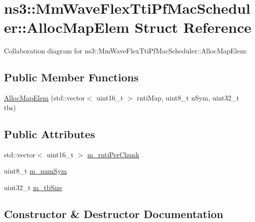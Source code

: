 \hypertarget{structns3_1_1MmWaveFlexTtiPfMacScheduler_1_1AllocMapElem}{}\section{ns3\+:\+:Mm\+Wave\+Flex\+Tti\+Pf\+Mac\+Scheduler\+:\+:Alloc\+Map\+Elem Struct Reference}
\label{structns3_1_1MmWaveFlexTtiPfMacScheduler_1_1AllocMapElem}


Collaboration diagram for ns3\+:\+:Mm\+Wave\+Flex\+Tti\+Pf\+Mac\+Scheduler\+:\+:Alloc\+Map\+Elem\+:
\subsection*{Public Member Functions}
\begin{DoxyCompactItemize}
\item 
\hyperlink{structns3_1_1MmWaveFlexTtiPfMacScheduler_1_1AllocMapElem_a311a654b51952538045d89c3a4c8c982}{Alloc\+Map\+Elem} (std\+::vector$<$ uint16\+\_\+t $>$ rnti\+Map, uint8\+\_\+t n\+Sym, uint32\+\_\+t tbs)
\end{DoxyCompactItemize}
\subsection*{Public Attributes}
\begin{DoxyCompactItemize}
\item 
std\+::vector$<$ uint16\+\_\+t $>$ \hyperlink{structns3_1_1MmWaveFlexTtiPfMacScheduler_1_1AllocMapElem_a4f7acb21c722350e588ffb3786dff855}{m\+\_\+rnti\+Per\+Chunk}
\item 
uint8\+\_\+t \hyperlink{structns3_1_1MmWaveFlexTtiPfMacScheduler_1_1AllocMapElem_a5c5cc7e33f85b68a50f52c334e025126}{m\+\_\+num\+Sym}
\item 
uint32\+\_\+t \hyperlink{structns3_1_1MmWaveFlexTtiPfMacScheduler_1_1AllocMapElem_a3c8cbfc4ab84e3eee2edf8a5b66f5e78}{m\+\_\+tb\+Size}
\end{DoxyCompactItemize}


\subsection{Constructor \& Destructor Documentation}
